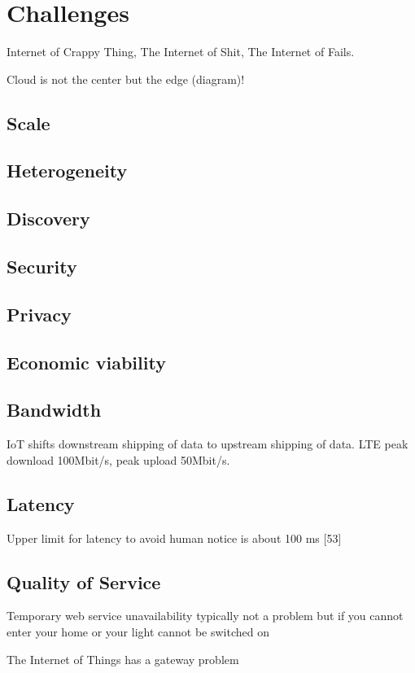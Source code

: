 \section{Challenges}

Internet of Crappy Thing, The Internet of Shit, The Internet of Fails.

Cloud is not the center but the edge (diagram)!

\subsection{Scale}
\subsection{Heterogeneity}
\subsection{Discovery}
\subsection{Security}
\subsection{Privacy}
\subsection{Economic viability}
\subsection{Bandwidth}
IoT shifts downstream shipping of data to upstream shipping of data. LTE peak download 100Mbit/s, peak upload 50Mbit/s.

\subsection{Latency}
Upper limit for latency to avoid human notice is about 100 ms [53]

\subsection{Quality of Service}
Temporary web service unavailability typically not a problem but if you cannot enter your home or your light cannot be switched on 


The Internet of Things has a gateway problem \cite{Zachariah:2015:ITG:2699343.2699344}

